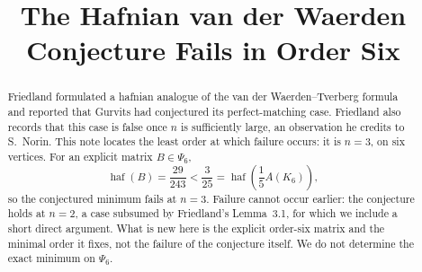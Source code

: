 \documentclass[11pt]{amsart}
\title[Order-six failure of the hafnian conjecture]
{The Hafnian van der Waerden Conjecture Fails in Order Six}
\date{}
\newcommand{\haf}{\operatorname{haf}}
\theoremstyle{remark}
\begin{document}
\begin{abstract}
Friedland formulated a hafnian analogue of the van der Waerden--Tverberg
formula and reported that Gurvits had conjectured its perfect-matching case.
Friedland also records that this case is false once $n$ is sufficiently large,
an observation he credits to S.~Norin. This note locates the least
order at which failure occurs: it is $n=3$, on six vertices. For an explicit
matrix $B\in\Psi_6$,
\[
  \haf(B)=\frac{29}{243}<\frac{3}{25}
  =\haf\!\left(\frac{1}{5}A(K_6)\right),
\]
so the conjectured minimum fails at $n=3$. Failure cannot occur earlier: the
conjecture holds at $n=2$, a case subsumed by Friedland's Lemma~3.1, for which
we include a short direct argument. What is new here is the explicit
order-six matrix and the minimal order it fixes, not the failure of the
conjecture itself. We do not determine the exact minimum on $\Psi_6$.
\end{abstract}

\maketitle
\end{document}
